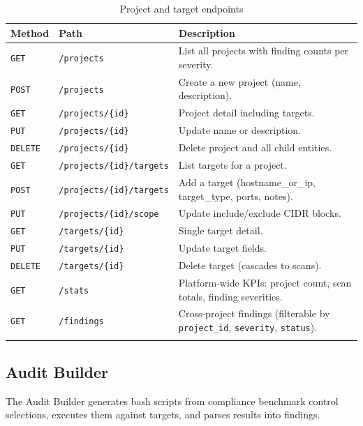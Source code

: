 \documentclass[11pt,a4paper,twoside,openright]{book}
\newcommand{\mget}{\colorbox{SeraphLow}{\color{white}\texttt{\footnotesize GET}}}
\newcommand{\mpost}{\colorbox{SeraphAccent}{\color{SeraphBg}\texttt{\footnotesize POST}}}
\newcommand{\mput}{\colorbox{SeraphCyan}{\color{SeraphBg}\texttt{\footnotesize PUT}}}
\newcommand{\mdelete}{\colorbox{SeraphCrit}{\color{white}\texttt{\footnotesize DELETE}}}
\begin{document}
\begin{longtable}{L{1.2cm} L{5.5cm} X}
\toprule
\textbf{Method} & \textbf{Path} & \textbf{Description} \\
\midrule
\endhead
\mget    & \texttt{/projects}                        & List all projects with finding counts per severity. \\
\mpost   & \texttt{/projects}                        & Create a new project (name, description). \\
\mget    & \texttt{/projects/\{id\}}                 & Project detail including targets. \\
\mput    & \texttt{/projects/\{id\}}                 & Update name or description. \\
\mdelete & \texttt{/projects/\{id\}}                 & Delete project and all child entities. \\
\mget    & \texttt{/projects/\{id\}/targets}         & List targets for a project. \\
\mpost   & \texttt{/projects/\{id\}/targets}         & Add a target (hostname\_or\_ip, target\_type, ports, notes). \\
\mput    & \texttt{/projects/\{id\}/scope}           & Update include/exclude CIDR blocks. \\
\mget    & \texttt{/targets/\{id\}}                  & Single target detail. \\
\mput    & \texttt{/targets/\{id\}}                  & Update target fields. \\
\mdelete & \texttt{/targets/\{id\}}                  & Delete target (cascades to scans). \\
\mget    & \texttt{/stats}                           & Platform-wide KPIs: project count, scan totals, finding severities. \\
\mget    & \texttt{/findings}                        & Cross-project findings (filterable by \texttt{project\_id}, \texttt{severity}, \texttt{status}). \\
\bottomrule
\caption{Project and target endpoints}
\end{longtable}

\subsection{Audit Builder}

The Audit Builder generates bash scripts from compliance benchmark control selections, executes them against targets, and parses results into findings.
\end{document}
